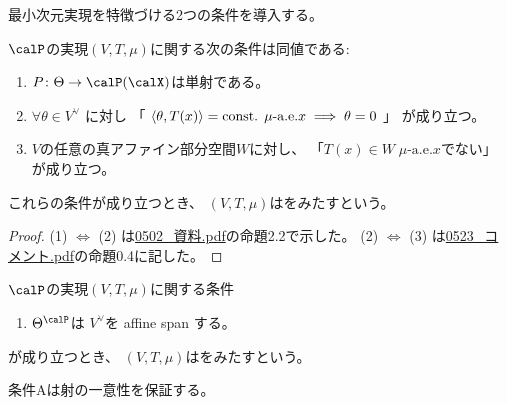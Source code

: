 \documentclass[report]{jlreq}
\begin{document}
最小次元実現を特徴づける2つの条件を導入する。

\begin{propdef}[条件A]
    $\calP$の実現$(V, T, \mu)$に関する次の条件は同値である:
    \begin{enumerate}
        \item $P \colon \Theta \to \calP(\calX)$は単射である。
        \item $\forall \theta \in V^\vee$
            に対し
            「
                $\left\langle{\theta},{T(x)}\right\rangle = \text{const. $\mu$-a.e.$x$}
                \implies
                \theta = 0$
            」
            が成り立つ。
        \item $V$の任意の真アファイン部分空間$W$に対し、
            「$T(x) \in W \; \text{$\mu$-a.e.$x$}$でない」
            が成り立つ。
    \end{enumerate}
    これらの条件が成り立つとき、
    $(V, T, \mu)$はをみたすという。
\end{propdef}

\begin{proof}
    (1) $\iff$ (2) は\url{0502_資料.pdf}の命題2.2で示した。
    (2) $\iff$ (3) は\url{0523_コメント.pdf}の命題0.4に記した。
\end{proof}

\begin{definition}[条件B]
    $\calP$の実現$(V, T, \mu)$に関する条件
    \begin{enumerate}
        \item $\Theta^\calP$は
            $V^\vee$を affine span する。
    \end{enumerate}
    が成り立つとき、
    $(V, T, \mu)$はをみたすという。
\end{definition}

条件Aは射の一意性を保証する。

\end{document}
